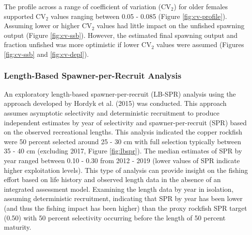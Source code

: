 \documentclass[11pt,
  english,
  a4paper,
]{article}
\begin{document}
\leavevmode\tagmcend\tagstructend\par


The profile across a range of coefficient of variation ({\(\text{CV}_2\)\leavevmode\tagmcend\tagstructend}) for older females supported {\(\text{CV}_2\)\leavevmode\tagmcend\tagstructend} values ranging between 0.05 - 0.085 (Figure \ref{fig:cv-profile}). Assuming lower or higher {\(\text{CV}_2\)\leavevmode\tagmcend\tagstructend} values had little impact on the unfished spawning output (Figure \ref{fig:cv-ssb}). However, the estimated final spawning output and fraction unfished was more optimistic if lower {\(\text{CV}_2\)\leavevmode\tagmcend\tagstructend} values were assumed (Figures \ref{fig:cv-ssb} and \ref{fig:cv-depl}).

\leavevmode\tagmcend\tagstructend\par


\hypertarget{length-based-spawner-per-recruit-analysis}{%
\subsubsection{Length-Based Spawner-per-Recruit Analysis}\label{length-based-spawner-per-recruit-analysis}}

\leavevmode\tagmcend\tagstructend


An exploratory length-based spawner-per-recruit (LB-SPR) analysis using the approach developed by Hordyk et al. {(2015)\leavevmode\tagmcend\tagstructend} was conducted. This approach assumes asymptotic selectivity and deterministic recruitment to produce independent estimates by year of selectivity and spawner-per-recruit (SPR) based on the observed recreational lengths. This analysis indicated the copper rockfish were 50 percent selected around 25 - 30 cm with full selection typically between 35 - 40 cm (excluding 2017, Figure \ref{fig:lbspr}). The median estimates of SPR by year ranged between 0.10 - 0.30 from 2012 - 2019 (lower values of SPR indicate higher exploitation levels). This type of analysis can provide insight on the fishing effort based on life history and observed length data in the absence of an integrated assessment model. Examining the length data by year in isolation, assuming deterministic recruitment, indicating that SPR by year has been lower (and thus the fishing impact has been higher) than the proxy rockfish SPR target (0.50) with 50 percent selectivity occurring before the length of 50 percent maturity.
\end{document}
